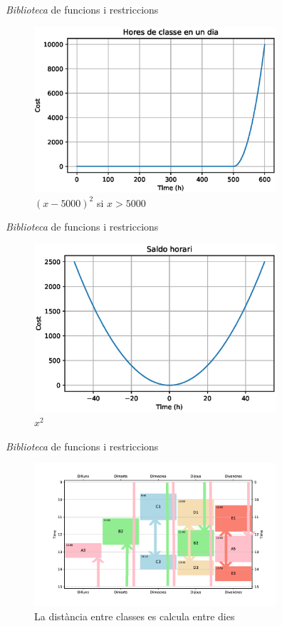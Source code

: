 \documentclass[twocolumn]{beamer}
\begin{document}
\begin{frame}{\textit{Biblioteca} de funcions i restriccions}
\begin{figure}
	\includegraphics[width=9cm]{hores_dia}
	\caption{$(x-5000)^2$ si $x>5000$}
\end{figure}
\end{frame}

\begin{frame}{\textit{Biblioteca} de funcions i restriccions}
\begin{figure}
	\includegraphics[width=9cm]{saldo}
	\caption{$x^2$}
\end{figure}
\end{frame}

\begin{frame}{\textit{Biblioteca} de funcions i restriccions}
\begin{figure}
	\includegraphics[width=9cm]{../plots/llibreria_funcs/horari}
	\caption{La distància entre classes es calcula entre dies}
\end{figure}
\end{frame}
\end{document}
